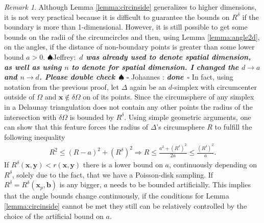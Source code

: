 \documentclass[preprint, 10pt]{elsarticle}
\newcommand{\vx}{{\mathbf x}}
\newcommand{\vy}{{\mathbf y}}
\newcommand{\vb}{{\mathbf b}}
\newif\ifnotesw \noteswtrue
\newcommand{\jeffrey}[1]{\ifnotesw  \textcolor[rgb]{0,0,1}{  $\spadesuit$Jeffrey:\ {\sf \bf \it #1}\ $\spadesuit$ }\fi}
\newcommand{\johannes}[1]{\ifnotesw  \textcolor[rgb]{1,0,1}{ $\square$ Johannes : {\sf \bf \it #1}\ $\square$ }\fi}
\theoremstyle{definition}
\theoremstyle{remark}
\newtheorem*{remark}{Remark}
\begin{document}
\begin{remark}
	Although Lemma \ref{lemma:circinside} generalizes to higher dimensions, it is not very practical because it is difficult to guarantee the bounds on $R^\delta$ if the boundary is more than 1-dimensional.
	However, it is still possible to get some bounds on the radii of the circumcircles and then, using Lemma \ref{lemma:angle2d}, on the angles, if the distance of non-boundary points is greater than some lower bound $a>0$. \jeffrey{$d$ was already used to denote spatial dimension, as well as using $n$ to denote for spatial dimension. I changed the $d \rightarrow a$  and $n \rightarrow d$. Please double check}\johannes{done}
    In fact, using notation from the previous proof, let $\Delta$ again be an $d$-simplex with circumcenter outside of $\Omega$ and $\vx \notin \delta\Omega$ on of its points.
    Since the circumsphere of any simplex in a Delaunay triangulation does not contain any other points the radius of the intersection with $\delta \Omega$ is bounded by $R^\delta$.
	Using simple geometric arguments, one can show that this feature forces the radius of $\Delta$'s circumsphere $R$ to fulfill the following inequality \begin{align} \label{eq:outsidecenter}
		R^2\le (R-a)^2+\left(R^\delta\right)^2 \Rightarrow R\le \frac{a^2+\left(R^\delta\right)^2}{2a}\le \frac{\left(R^\delta\right)^2}{a}.
	\end{align}  
	If $R^\delta(\vx,\vy)<r(\vx,\vy)$ there is a lower bound on $a$, continuously depending on $R^\delta$, solely due to the fact, that we have a Poisson-disk sampling. If $R^\delta=R^\delta(\vx_p,\vb)$ is any bigger, $a$ needs to be bounded artificially. This implies that the angle bounds change continuously, if the conditions for Lemma \ref{lemma:circinside} cannot be met they still can be relatively controlled by the choice of the artificial bound on $a$.
\end{remark}
\end{document}
